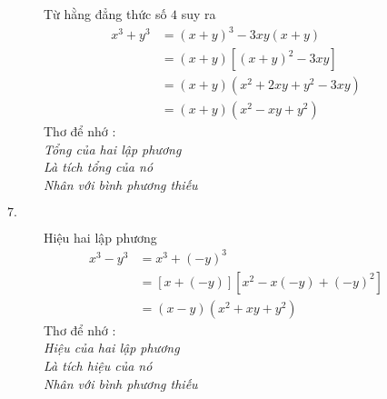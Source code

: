 \begin{description}
\begin{description}
            Từ hằng đẳng thức số $4$ suy ra
            \begin{equation*}
                \begin{split}
                    x^3+y^3&=(x+y)^3-3xy(x+y)\\
                    &=(x+y)[(x+y)^2-3xy]\\
                    &=(x+y)(x^2+2xy+y^2-3xy)\\
                    &=(x+y)(x^2-xy+y^2)
                \end{split}
            \end{equation*}
            Thơ để nhớ :\\
            \emph{Tổng của hai lập phương\\
            Là tích tổng của nó\\
            Nhân với bình phương thiếu\\}
            \item[$7.$] Hiệu hai lập phương
            \begin{equation*}
                \begin{split}
                    x^3-y^3&=x^3+(-y)^3\\
                    &=[x+(-y)][x^2-x(-y)+(-y)^2]\\
                    &=(x-y)(x^2+xy+y^2)
                \end{split}
            \end{equation*}
            Thơ để nhớ :\\
            \emph{Hiệu của hai lập phương\\
            Là tích hiệu của nó\\
            Nhân với bình phương thiếu\\}
        \end{description}
    \end{description}

